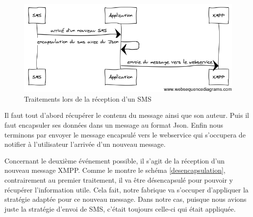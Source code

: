 \begin{figure}[!h]
  \center
  \includegraphics[width=12cm]{img/encapsulation-sms.png}
  \caption{Traitements lors de la réception d'un SMS}
  \label{encapsulation-sms}
\end{figure}
 
Il faut tout d'abord récupérer le contenu du message ainsi que son auteur. Puis il faut encapsuler 
ses données dans un message au format Json. Enfin nous terminons par envoyer le message encapsulé vers 
le webservice qui s'occupera de notifier à l'utilisateur l'arrivée d'un nouveau message.
 
Concernant le deuxième événement possible, il s'agit de la réception d'un nouveau message XMPP. Comme le
montre le schéma \ref{desencapsulation}, contrairement au premier traitement, il va être désencapsulé pour 
pouvoir y récupérer l'information utile. Cela fait, notre fabrique va s'occuper d'appliquer la stratégie 
adaptée pour ce nouveau message. Dans notre cas, puisque nous avions juste la stratégie d'envoi de SMS, c'était toujours celle-ci qui était appliquée.